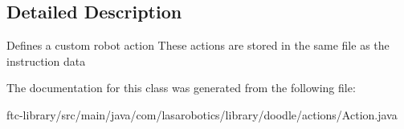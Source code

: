 \subsection{Detailed Description}
Defines a custom robot action These actions are stored in the same file as the instruction data 

The documentation for this class was generated from the following file\+:\begin{DoxyCompactItemize}
\item 
ftc-\/library/src/main/java/com/lasarobotics/library/doodle/actions/Action.\+java\end{DoxyCompactItemize}
